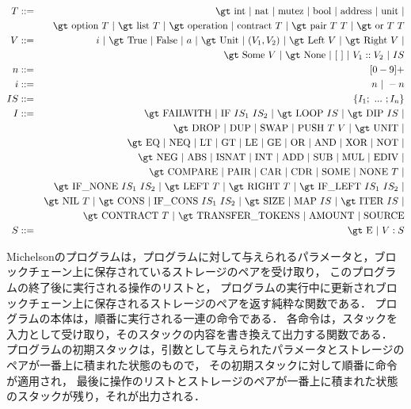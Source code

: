 \documentclass{kuisthesis}
\begin{document}
\begin{eqnarray*}
  T &::=& \mbox{\gt int\ |\ nat\ |\ mutez\ |\ bool\ |\ address\ |\ unit}\ |\\
  && \mbox{\gt option}\ T\ |\ \mbox{\gt list}\ T\ |\ \mbox{\gt operation\ |\ contract}\ T\ |\ \mbox{\gt pair}\ T\ T\ |\ \mbox{\gt or}\ T\ T \\
  V &::=&\ i\ |\ \mbox{\gt True\ |\ False}\ |\ a\ |\ \mbox{\gt Unit}\ |\ (V_1, V_2)\ |\ \mbox{\gt Left}\ V\ |\ \mbox{\gt Right}\ V\ |\\
  && \mbox{\gt Some}\ V\ |\ \mbox{\gt None}\ |\ [\ ]\ |\ V_1 :: V_2\ |\ IS\\
  n &::=& [0-9]+ \\
  i &::=& n\ |\ -n \\
  IS &::=& \{I_1;\ ...\ ;I_n\} \\
  I &::=& \mbox{\gt FAILWITH\ |\ IF}\ IS_1\ IS_2\ |\ \mbox{\gt LOOP}\ IS\ |\ \mbox{\gt DIP}\ IS\ | \\
  && \mbox{\gt DROP\ |\ DUP\ |\ SWAP\ |\ PUSH}\ T\ V\ |\ \mbox{\gt UNIT}\ |\\
  && \mbox{\gt EQ\ |\ NEQ\ |\ LT\ |\ GT\ |\ LE\ |\ GE\ |\ OR\ |\ AND\ |\ XOR\ |\ NOT}\ | \\
  && \mbox{\gt NEG\ |\ ABS\ |\ ISNAT\ |\ INT\ |\ ADD\ |\ SUB\ |\ MUL\ |\ EDIV}\ |\\
  && \mbox{\gt COMPARE\ |\ PAIR\ |\ CAR\ |\ CDR\ |\ SOME\ |\ NONE}\ T\ |\\
  && \mbox{\gt IF\_NONE}\ IS_1\ IS_2\ |\ \mbox{\gt LEFT}\ T\ |\ \mbox{\gt RIGHT}\ T\ |\ \mbox{\gt IF\_LEFT}\ IS_1\ IS_2\ | \\
  && \mbox{\gt NIL}\ T\ |\ \mbox{\gt CONS\ |\ IF\_CONS}\ IS_1\ IS_2\ |\ \mbox{\gt SIZE\ |\ MAP}\ IS\ |\ \mbox{\gt ITER}\ IS\ | \\
  && \mbox{\gt CONTRACT}\ T\ |\ \mbox{\gt TRANSFER\_TOKENS\ |\ AMOUNT\ |\ SOURCE} \\
  S &::=& \mbox{\gt E}\ |\ V : S
\end{eqnarray*}

Michelsonのプログラムは，プログラムに対して与えられるパラメータと，ブロックチェーン上に保存されているストレージのペアを受け取り，
このプログラムの終了後に実行される操作のリストと，
プログラムの実行中に更新されブロックチェーン上に保存されるストレージのペアを返す純粋な関数である．
プログラムの本体は，順番に実行される一連の命令である．
各命令は，スタックを入力として受け取り，そのスタックの内容を書き換えて出力する関数である．
プログラムの初期スタックは，引数として与えられたパラメータとストレージのペアが一番上に積まれた状態のもので，
その初期スタックに対して順番に命令が適用され，
最後に操作のリストとストレージのペアが一番上に積まれた状態のスタックが残り，それが出力される．
\end{document}
